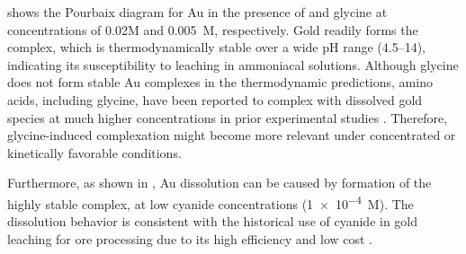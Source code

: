 \documentclass[journal=jacsat,manuscript=article]{achemso}
\begin{document}
 shows the Pourbaix diagram for Au in the presence of  and glycine at concentrations of 0.02M and 0.005~M, respectively. Gold readily forms the \ce{[Au(NH3)_2]^+} complex, which is thermodynamically stable over a wide pH range (4.5–14), indicating its susceptibility to leaching in ammoniacal solutions. Although glycine does not form stable Au complexes in the thermodynamic predictions, amino acids, including glycine, have been reported to complex with dissolved gold species at much higher concentrations in prior experimental studies \cite{Sarvar2023ApplicationStructure, Brown1982TheGold}. Therefore, glycine-induced complexation might become more relevant under concentrated or kinetically favorable conditions.

Furthermore, as shown in , Au dissolution can be caused by formation of the highly stable \ce{[Au(CN)_2]^-} complex, at low cyanide concentrations (\num{1e-4}~M). The dissolution behavior is consistent with the historical use of cyanide in gold leaching for ore processing due to its high efficiency and low cost \cite{Hilson2006AlternativesFuture, young2001cyanide}.
\end{document}
